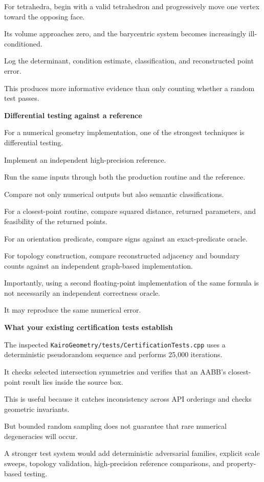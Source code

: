 For tetrahedra, begin with a valid tetrahedron and progressively move one vertex toward the opposing face.

Its volume approaches zero, and the barycentric system becomes increasingly ill-conditioned.

Log the determinant, condition estimate, classification, and reconstructed point error.

This produces more informative evidence than only counting whether a random test passes.

\textbf{Differential testing against a reference}

For a numerical geometry implementation, one of the strongest techniques is differential testing.

Implement an independent high-precision reference.

Run the same inputs through both the production routine and the reference.

Compare not only numerical outputs but also semantic classifications.

For a closest-point routine, compare squared distance, returned parameters, and feasibility of the returned points.

For an orientation predicate, compare signs against an exact-predicate oracle.

For topology construction, compare reconstructed adjacency and boundary counts against an independent graph-based implementation.

Importantly, using a second floating-point implementation of the same formula is not necessarily an independent correctness oracle.

It may reproduce the same numerical error.

\textbf{What your existing certification tests establish}

The inspected \texttt{KairoGeometry/tests/CertificationTests.cpp} uses a deterministic pseudorandom sequence and performs 25,000 iterations.

It checks selected intersection symmetries and verifies that an AABB's closest-point result lies inside the source box.

This is useful because it catches inconsistency across API orderings and checks geometric invariants.

But bounded random sampling does not guarantee that rare numerical degeneracies will occur.

A stronger test system would add deterministic adversarial families, explicit scale sweeps, topology validation, high-precision reference comparisons, and property-based testing.

